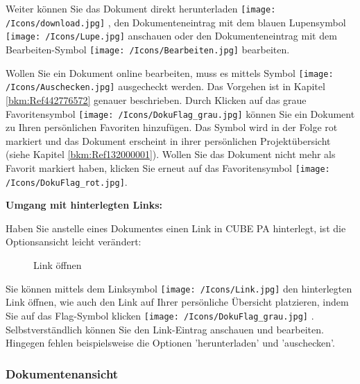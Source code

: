 Weiter können Sie das Dokument direkt herunterladen \texttt{[image: /Icons/download.jpg]} , den Dokumenteneintrag mit dem blauen Lupensymbol \texttt{[image: /Icons/Lupe.jpg]}  anschauen oder den Dokumenteneintrag mit dem Bearbeiten-Symbol \texttt{[image: /Icons/Bearbeiten.jpg]}  bearbeiten. \newline

Wollen Sie ein Dokument online bearbeiten, muss es mittels Symbol \texttt{[image: /Icons/Auschecken.jpg]}  ausgecheckt werden. Das Vorgehen ist in Kapitel \ref{bkm:Ref442776572} genauer beschrieben. Durch Klicken auf das graue Favoritensymbol \texttt{[image: /Icons/DokuFlag\_grau.jpg]}  können Sie ein Dokument zu Ihren persönlichen Favoriten hinzufügen. Das Symbol wird in der Folge rot markiert und das Dokument erscheint in ihrer persönlichen Projektübersicht (siehe Kapitel \ref{bkm:Ref132000001}). Wollen Sie das Dokument nicht mehr als Favorit markiert haben, klicken Sie erneut auf das Favoritensymbol \texttt{[image: /Icons/DokuFlag\_rot.jpg]}. \newline


\textbf{Umgang mit hinterlegten Links:}

Haben Sie anstelle eines Dokumentes einen Link in CUBE PA hinterlegt, ist die Optionsansicht leicht verändert:

\begin{figure}[H]
\caption{Link öffnen}
\end{figure}

Sie können mittels dem Linksymbol \texttt{[image: /Icons/Link.jpg]}  den hinterlegten Link öffnen, wie auch den Link auf Ihrer persönliche Übersicht platzieren, indem Sie auf das Flag-Symbol klicken \texttt{[image: /Icons/DokuFlag\_grau.jpg]} . Selbstverständlich können Sie den Link-Eintrag anschauen und bearbeiten. Hingegen fehlen beispielsweise die Optionen 'herunterladen' und 'auschecken'.


\pagebreak
\subsubsection{Dokumentenansicht}
\label{bkm:Ref443047930}

